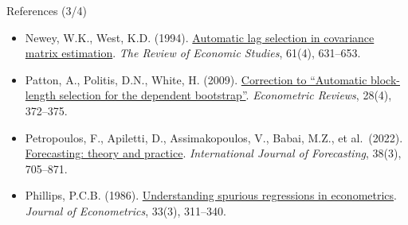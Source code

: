 \begin{frame}{References (3/4)}
\begin{itemize}
    \item Newey, W.K., West, K.D. (1994). \href{https://doi.org/10.2307/2297912}{Automatic lag selection in covariance matrix estimation}. \emph{The Review of Economic Studies}, 61(4), 631--653.
    \item Patton, A., Politis, D.N., White, H. (2009). \href{https://doi.org/10.1080/07474930802459016}{Correction to ``Automatic block-length selection for the dependent bootstrap''}. \emph{Econometric Reviews}, 28(4), 372--375.
    \item Petropoulos, F., Apiletti, D., Assimakopoulos, V., Babai, M.Z., et al.\ (2022). \href{https://doi.org/10.1016/j.ijforecast.2021.11.001}{Forecasting: theory and practice}. \emph{International Journal of Forecasting}, 38(3), 705--871.
    \item Phillips, P.C.B. (1986). \href{https://doi.org/10.1016/0304-4076(86)90001-1}{Understanding spurious regressions in econometrics}. \emph{Journal of Econometrics}, 33(3), 311--340.
\end{itemize}
\end{frame}

